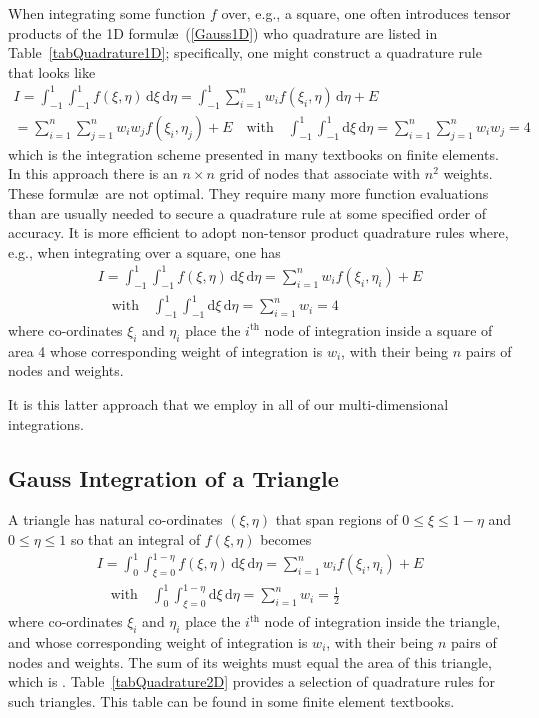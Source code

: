 When integrating some function $f$ over, e.g., a square, one often introduces tensor products of the 1D formul\ae\ (\ref{Gauss1D}) who quadrature are listed in Table~\ref{tabQuadrature1D}; specifically, one might construct a quadrature rule that looks like
\begin{multline*}
    I = \int_{-1}^1 \int_{-1}^1 f ( \xi , \eta ) \, \mathrm{d} \xi \, \mathrm{d} \eta =
    \int_{-1}^1 \sum_{i=1}^n w_i f ( \xi_i , \eta ) \, \mathrm{d} \eta + E \\ =
    \sum_{i=1}^n \sum_{j=1}^n w_i w_j f ( \xi_i , \eta_ j ) + E  
    \quad \text{with} \quad
    \int_{-1}^1 \int_{-1}^1 \mathrm{d} \xi \, \mathrm{d} \eta = 
    \sum_{i=1}^n \sum_{j=1}^n w_i w_j = 4
\end{multline*}
which is the integration scheme presented in many textbooks on finite elements.  In this approach there is an $n \times n$ grid of nodes that associate with $n^2$ weights.  These formul\ae\ are not optimal.  They require many more function evaluations than are usually needed to secure a quadrature rule at some specified order of accuracy.  It is more efficient to adopt non-tensor product quadrature rules where, e.g., when integrating over a square, one has
\begin{multline*}
    I = \int_{-1}^1 \int_{-1}^1 f ( \xi , \eta ) \, \mathrm{d} \xi \, \mathrm{d} \eta =
    \sum_{i=1}^n w_i f ( \xi_i , \eta_i ) + E  \\ 
    \quad \text{with} \quad
    \int_{-1}^1 \int_{-1}^1 \mathrm{d} \xi \, \mathrm{d} \eta = 
    \sum_{i=1}^n w_i = 4
\end{multline*}
where co-ordinates $\xi_i$ and $\eta_i$ place the $i^{\text{th}}$ node of integration inside a square of area 4 whose corresponding weight of integration is $w_i$, with their being $n$ pairs of nodes and weights.  

It is this latter approach that we employ in all of our multi-dimensional integrations.

\subsection{Gauss Integration of a Triangle}

A triangle has natural co-ordinates $( \xi , \eta )$ that span regions of $0 \leq \xi \leq 1-\eta$ and $0 \leq \eta \leq 1$ so that an integral of $f(\xi, \eta)$ becomes
\begin{multline}
I = \int_0^1 \int_{\xi =0}^{1-\eta} f ( \xi , \eta ) \, \mathrm{d} \xi \, \mathrm{d} \eta =
\sum_{i=1}^n w_i f ( \xi_i , \eta_i ) + E \\
\quad \text{with} \quad
\int_0^1 \int_{\xi =0}^{1-\eta} \mathrm{d} \xi \, \mathrm{d} \eta = 
\sum_{i=1}^n w_i = \frac{1}{2}
\label{GaussTriangle}
\end{multline}
where co-ordinates $\xi_i$ and $\eta_i$ place the $i^{\text{th}}$ node of integration inside the triangle, and whose corresponding weight of integration is $w_i$, with their being $n$ pairs of nodes and weights.  The sum of its weights must equal the area of this triangle, which is . Table~\ref{tabQuadrature2D} provides a selection of quadrature rules for such triangles.  This table can be found in some finite element textbooks.

